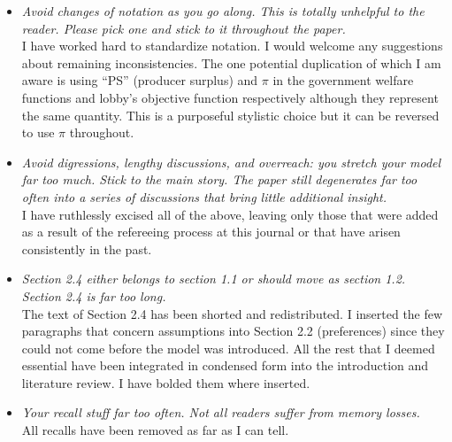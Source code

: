 \documentclass[12pt]{report}
\begin{document}
\begin{itemize}
\renewcommand\labelitemi{-}
	\item \textit{Avoid changes of notation as you go along. This is totally unhelpful to the reader. Please pick one and stick to it throughout the paper.} \\
	I have worked hard to standardize notation. I would welcome any suggestions about remaining inconsistencies. The one potential duplication of which I am aware is using ``PS'' (producer surplus) and $\pi$ in the government welfare functions and lobby's objective function respectively although they represent the same quantity. This is a purposeful stylistic choice but it can be reversed to use $\pi$ throughout.
	\item \textit{Avoid digressions, lengthy discussions, and overreach: you stretch your model far too much. Stick to the main story. The paper still degenerates far too often into a series of discussions that bring little additional insight.} \\
	I have ruthlessly excised all of the above, leaving only those that were added as a result of the refereeing process at this journal or that have arisen consistently in the past.
	\item \textit{Section 2.4 either belongs to section 1.1 or should move as section 1.2. Section 2.4 is far too long.} \\
	The text of Section 2.4 has been shorted and redistributed. I inserted the few paragraphs that concern assumptions into Section 2.2 (preferences) since they could not come before the model was introduced. All the rest that I deemed essential have been integrated in condensed form into the introduction and literature review. I have bolded them where inserted.
	
	\item \textit{Your recall stuff far too often. Not all readers suffer from memory losses.} \\
	All recalls have been removed as far as I can tell.
\end{itemize}
\end{document}
